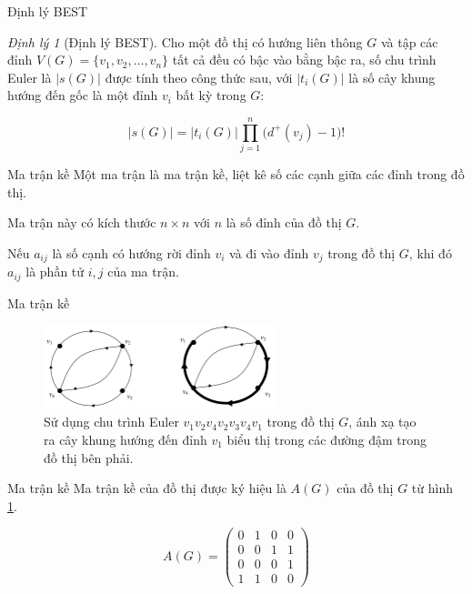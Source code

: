 \documentclass[10pt]{beamer}
\theoremstyle{remark}
\newtheorem{dl}{Định lý}
\numberwithin{algocf}{section}
\numberwithin{equation}{section}
\numberwithin{dl}{section}
\numberwithin{figure}{section}
\begin{document}
\begin{frame}{Định lý BEST}
    \begin{dl}[Định lý BEST]
        Cho một đồ thị có hướng liên thông $G$ và tập các đỉnh $V(G)=\lbrace v_1, v_2, \dots, v_n \rbrace$ tất cả đều có bậc vào bằng bậc ra, số chu trình Euler là $\lvert s(G) \rvert$ được tính theo công thức sau, với $\lvert t_i (G) \rvert$ là số cây khung hướng đến gốc là một đỉnh $v_i$ bất kỳ trong $G$:

        \begin{equation*}
            \lvert s(G) \rvert = \lvert t_i (G) \rvert \prod_{j=1}^n \big( d^+ (v_j) - 1 \big)!
        \end{equation*}
    \end{dl}
\end{frame}

\begin{frame}{Ma trận kề}
    Một ma trận là ma trận kề, liệt kê số các cạnh giữa các đỉnh trong đồ thị.

    Ma trận này có kích thước $n \times n$ với $n$ là số đỉnh của đồ thị $G$.

    Nếu $a_{ij}$ là số cạnh có hướng rời đỉnh $v_i$ và đi vào đỉnh $v_j$ trong đồ thị $G$, khi đó $a_{ij}$ là phần tử $i, j$ của ma trận.

\end{frame}

\begin{frame}{Ma trận kề}
    \begin{figure}[h!]
        \centering
        \includegraphics[width=0.6\textwidth]{4.png}
        \caption{Sử dụng chu trình Euler $v_1 v_2 v_4 v_2 v_3 v_4 v_1$ trong đồ thị $G$, ánh xạ tạo ra cây khung hướng đến đỉnh $v_1$ biểu thị trong các đường đậm trong đồ thị bên phải.}
        \label{fig:4}
    \end{figure}
\end{frame}

\begin{frame}{Ma trận kề}
    Ma trận kề của đồ thị được ký hiệu là $A(G)$ của đồ thị $G$ từ hình \ref{fig:4}.

    \begin{equation*}
        A(G) = \begin{pmatrix}
            0 & 1 & 0 & 0 \\ 
            0 & 0 & 1 & 1 \\ 
            0 & 0 & 0 & 1 \\ 
            1 & 1 & 0 & 0
        \end{pmatrix}
    \end{equation*}
\end{frame}
\end{document}
